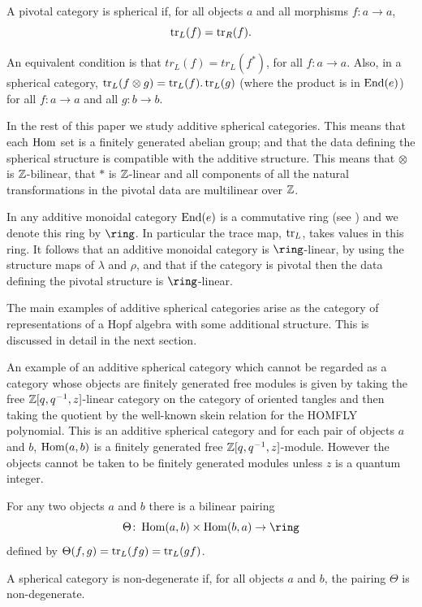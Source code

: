  A pivotal category is spherical if,
for all objects $a$ and all morphisms $f\colon a\to a$,
$$\operatorname{tr}_L(f)=\operatorname{tr}_R(f).$$
\enddefinition

An equivalent condition is that $tr_L(f)=tr_L(f^*)$, for all 
$f\colon a\to a$. 
Also, in a spherical category, $\operatorname{tr}_L(f\otimes g)=\operatorname{tr}_L(f).\operatorname{tr}_L(g)$
(where the product is in $\operatorname{End}(e)$)
for all $f\colon a\to a$ and all $g\colon b\to b$.

In the rest of this paper we study additive spherical categories.
This means that each $\operatorname{Hom}$ set is a finitely generated abelian group;
and that the data defining the spherical structure is compatible with the 
additive structure. This means that $\otimes$ is ${\Bbb Z}$-bilinear, that $*$
is ${\Bbb Z}$-linear and all components of all the natural transformations in the
pivotal data are multilinear over ${\Bbb Z}$. 

In any additive monoidal category $\operatorname{End} (e)$ is a commutative ring
(see \cite{Kelly and Laplaza  1980})  and we denote this ring by $\ring$. 
In particular the trace map, $\operatorname{tr}_L$, takes values in this ring.
It follows that an additive monoidal category is $\ring$-linear, by using
the structure maps of $\lambda$ and $\rho$, and that
if the category is pivotal then the data defining the pivotal structure
is $\ring$-linear.

The main examples of additive spherical categories arise
as the category of representations of a Hopf algebra with some additional
structure. This is discussed in detail in the next section.

 An example of an additive spherical category 
which cannot be regarded as a category whose objects are finitely
generated free modules is given by taking the free ${\Bbb Z} [q,q^{-1},z]$-linear
category on the category of oriented tangles and then taking the quotient
by the well-known skein relation for the HOMFLY polynomial. This is an
additive spherical category and for each pair of objects $a$ and $b$,
$\operatorname{Hom} (a,b)$ is a finitely generated free ${\Bbb Z} [q,q^{-1},z]$-module.
However the objects cannot be taken to be finitely generated modules unless
$z$ is a quantum integer.
\endexample

 For any two objects $a$ and $b$ there
is a bilinear pairing
$$\Theta\colon\Hom (a,b)\times\Hom (b,a)\to\ring$$
defined by $\Theta (f,g)=\operatorname{tr}_L(fg)=\operatorname{tr}_L(gf)$.
\enddefinition

A spherical category is non-degenerate if, for all objects $a$ and $b$,
the pairing $\Theta$ is non-degenerate. \enddefinition

